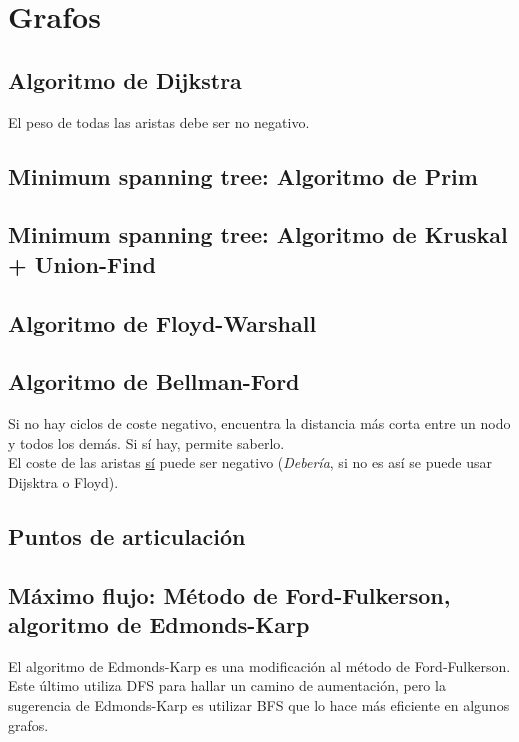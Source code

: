 \documentclass[10pt,letterpaper,twocolumn]{article}
\newcommand{\codigofuente}[1]{

\dotfill
}
\begin{document}
\section{Grafos}
\subsection{Algoritmo de Dijkstra}
El peso de todas las aristas debe ser no negativo.
\codigofuente{./src/grafos/dijkstra.cpp}

\subsection{Minimum spanning tree: Algoritmo de Prim}

\codigofuente{./src/grafos/prim.cpp}

\subsection{Minimum spanning tree: Algoritmo de Kruskal + Union-Find}
\codigofuente{./src/grafos/kruskal.cpp}

\subsection{Algoritmo de Floyd-Warshall}
\codigofuente{./src/grafos/floyd.cpp}

\subsection{Algoritmo de Bellman-Ford}
Si no hay ciclos de coste negativo, encuentra la distancia más corta
entre un nodo y todos los demás. Si sí hay, permite saberlo. \\ El
coste de las aristas \underline{sí} puede ser negativo
(\emph{Debería}, si no es así se puede usar Dijsktra o Floyd).
\codigofuente{./src/grafos/bellman.cpp}

\subsection{Puntos de articulación}
\codigofuente{./src/grafos/puntos_articulacion.cpp}

\subsection{Máximo flujo: Método de Ford-Fulkerson, algoritmo de Edmonds-Karp}
El algoritmo de Edmonds-Karp es una modificación al método de Ford-Fulkerson. Este último
utiliza DFS para hallar un camino de aumentación, pero la sugerencia de Edmonds-Karp
es utilizar BFS que lo hace más eficiente en algunos grafos.
\medskip
\end{document}
